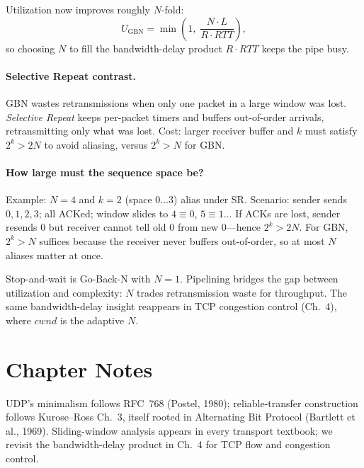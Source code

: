 Utilization now improves roughly $N$-fold:
\begin{equation}
U_{\text{GBN}}=\min\!\left(1,\; \frac{N\cdot L}{R\cdot RTT}\right),
\end{equation}
so choosing $N$ to fill the bandwidth-delay product $R\cdot RTT$ keeps the pipe busy.

\paragraph{Selective Repeat contrast.} GBN wastes retransmissions when only one packet in a large window was lost. \emph{Selective Repeat} keeps per-packet timers and buffers out-of-order arrivals, retransmitting only what was lost. Cost: larger receiver buffer and $k$ must satisfy $2^k > 2N$ to avoid aliasing, versus $2^k > N$ for GBN.

\paragraph{How large must the sequence space be?} Example: $N=4$ and $k=2$ (space $0\ldots3$) alias under SR. Scenario: sender sends $0,1,2,3$; all ACKed; window slides to $4\equiv0$, $5\equiv1\ldots$ If ACKs are lost, sender resends $0$ but receiver cannot tell old $0$ from new $0$---hence $2^k>2N$. For GBN, $2^k>N$ suffices because the receiver never buffers out-of-order, so at most $N$ aliases matter at once.

\begin{remark} Stop-and-wait is Go-Back-N with $N=1$. Pipelining bridges the gap between utilization and complexity: $N$ trades retransmission waste for throughput. The same bandwidth-delay insight reappears in TCP congestion control (Ch.~4), where $cwnd$ is the adaptive $N$.
\end{remark}

\section{Chapter Notes}
UDP's minimalism follows RFC~768 (Postel, 1980); reliable-transfer construction follows Kurose--Ross Ch.~3, itself rooted in Alternating Bit Protocol (Bartlett et al., 1969). Sliding-window analysis appears in every transport textbook; we revisit the bandwidth-delay product in Ch.~4 for TCP flow and congestion control.

